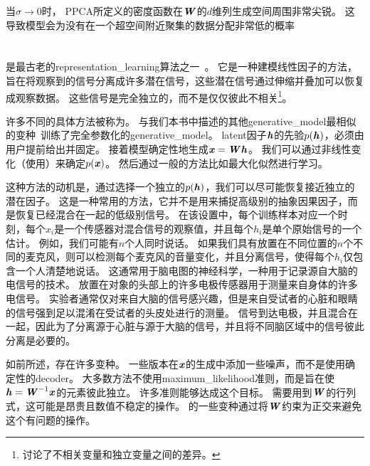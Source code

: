 当$\sigma\xrightarrow{} 0$时， \gls{PPCA}所定义的密度函数在$\boldsymbol{\mathit{W}}$的$d$维列生成空间周围非常尖锐。
这导致模型会为没有在一个超空间附近聚集的数据分配非常低的概率

\section{}
\label{sec:independent_component_analysis_ica}


是最古老的\gls{representation_learning}算法之一~\citep{Herault+Ans-1984,Jutten+Herault-91,Comon94,Hyvarinen-1999,Hyvarinen-2001,Hinton-ICA-2001,Teh-2003}。
它是一种建模线性因子的方法，旨在将观察到的信号分离成许多潜在信号，这些潜在信号通过伸缩并叠加可以恢复成观察数据。
这些信号是完全独立的，而不是仅仅彼此不相关\footnote{讨论了不相关变量和独立变量之间的差异。}。


许多不同的具体方法被称为。
与我们本书中描述的其他\gls{generative_model}最相似的变种~\citep{Pham-et-al-1992}训练了完全参数化的\gls{generative_model}。
\gls{latent}因子$\boldsymbol{\mathit{h}}$的先验$p(\boldsymbol{\mathit{h}})$，必须由用户提前给出并固定。
接着模型确定性地生成$\boldsymbol{\mathit{x}} = \boldsymbol{\mathit{W}} \boldsymbol{\mathit{h}}$。
我们可以通过非线性变化（使用）来确定$p(\boldsymbol{\mathit{x}})$。
然后通过一般的方法比如最大化似然进行学习。


这种方法的动机是，通过选择一个独立的$p(\boldsymbol{\mathit{h}})$，我们可以尽可能恢复接近独立的潜在因子。
这是一种常用的方法，它并不是用来捕捉高级别的抽象因果因子，而是恢复已经混合在一起的低级别信号。
在该设置中，每个训练样本对应一个时刻，每个$x_i$是一个传感器对混合信号的观察值，并且每个$h_i$是单个原始信号的一个估计。
例如，我们可能有$n$个人同时说话。 
如果我们具有放置在不同位置的$n$个不同的麦克风，则可以检测每个麦克风的音量变化，并且分离信号，使得每个$h_i$仅包含一个人清楚地说话。
这通常用于脑电图的神经科学，一种用于记录源自大脑的电信号的技术。
放置在对象的头部上的许多电极传感器用于测量来自身体的许多电信号。
实验者通常仅对来自大脑的信号感兴趣，但是来自受试者的心脏和眼睛的信号强到足以混淆在受试者的头皮处进行的测量。
信号到达电极，并且混合在一起，因此为了分离源于心脏与源于大脑的信号，并且将不同脑区域中的信号彼此分离是必要的。


如前所述，存在许多变种。
一些版本在$\boldsymbol{\mathit{x}}$的生成中添加一些噪声，而不是使用确定性的\gls{decoder}。
大多数方法不使用\gls{maximum_likelihood}准则，而是旨在使$\boldsymbol{\mathit{h}} = \boldsymbol{\mathit{W}}^{-1}\boldsymbol{\mathit{x}}$的元素彼此独立。
许多准则能够达成这个目标。
需要用到$\boldsymbol{\mathit{W}}$的行列式，这可能是昂贵且数值不稳定的操作。
的一些变种通过将$\boldsymbol{\mathit{W}}$约束为正交来避免这个有问题的操作。


